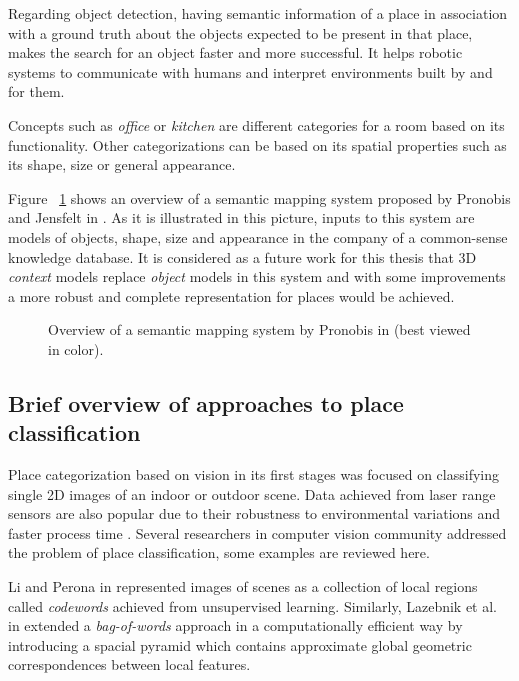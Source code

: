 Regarding object detection, having semantic information of a place in association with a ground truth about the objects expected
to be present in that place, makes the search for an object faster and more successful.
It helps robotic systems to communicate with humans and interpret environments built by and for them.

Concepts such as {\it office} or {\it kitchen} are different categories for a room based on its functionality.
Other categorizations can be  based on its spatial properties such as its shape, size or general appearance.

Figure ~\ref{semanticmapping.figure} shows an overview of a semantic mapping system proposed by Pronobis and Jensfelt in \cite{pronobis2011phd}.
As it is illustrated in this picture, inputs to this system are models of objects, shape, size and appearance in the company of a 
common-sense knowledge database.
It is considered as a future work for this thesis that 3D {\it context} models replace {\it object} models in this system and with some improvements 
a more robust and complete representation for places would be achieved.

\begin{figure}[t]
  \caption[Overview of a semantic mapping system]
  {Overview of a semantic mapping system by Pronobis in \cite{pronobis2011phd}(best viewed in color).}
  \label{semanticmapping.figure}
\end{figure}

\subsection{Brief overview of approaches to place classification}
\label{OverviewPlaceClassification.sec}
 Place categorization based on vision in its first stages was focused on classifying single 2D images of an indoor or 
 outdoor scene.
 Data achieved from laser range sensors are also popular due to their robustness to environmental variations and faster process time
 \cite{pronobis2011phd}.
 Several researchers in computer vision community addressed the problem of place classification, some examples are 
 reviewed here.
 
 Li and Perona in \cite{Li:2005:BHM:1068508.1069129} represented images of scenes as a collection of local regions 
 called {\it codewords} achieved from unsupervised learning. 
 Similarly, Lazebnik et al. in \cite{1641019} extended a {\it bag-of-words} approach in a computationally efficient way
 by introducing a spacial pyramid which contains approximate global geometric correspondences between local features.
  
